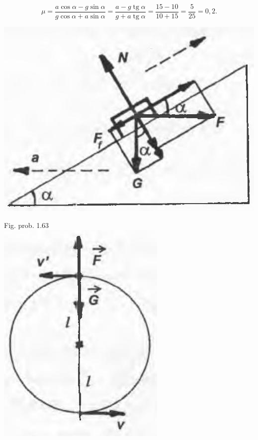 \documentclass[10pt]{article}
\begin{document}
$$
\mu=\frac{a \cos \alpha-g \sin \alpha}{g \cos \alpha+a \sin \alpha}=\frac{a-g \operatorname{tg} \alpha}{g+a \operatorname{tg} \alpha}=\frac{15-10}{10+15}=\frac{5}{25}=0,2 .
$$

\begin{center}
\includegraphics[max width=\textwidth]{2025_07_01_5b3ff9fa0d508c8e9f17g-211}
\end{center}

Fig. prob. 1.63\\
\includegraphics[max width=\textwidth, center]{2025_07_01_5b3ff9fa0d508c8e9f17g-211(1)}
\end{document}
